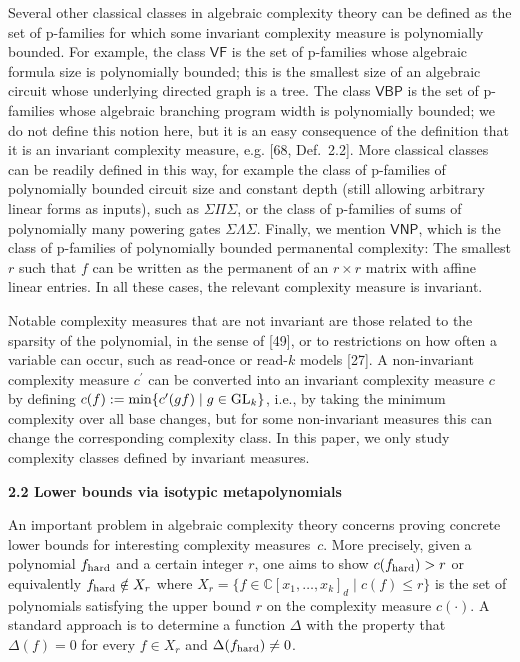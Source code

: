Several other classical classes in algebraic complexity theory can be defined as the set of p-families for which some invariant complexity measure is polynomially bounded.
For example, the class $\mathsf{VF}$ is the set of p-families whose algebraic formula size is polynomially bounded; this is the smallest size of an algebraic circuit whose underlying directed graph is a tree. The class $\mathsf{VBP}$ is the set of p-families whose algebraic branching program width is polynomially bounded; we do not define this notion here, but it is an easy consequence of the definition that it is an invariant complexity measure, e.g. [68, Def. 2.2]. More classical classes can be readily defined in this way, for example the class of p-families of polynomially bounded circuit size and constant depth (still allowing arbitrary linear forms as inputs), such as $\Sigma\Pi\Sigma$, or the class of p-families of sums of polynomially many powering gates $\Sigma\Lambda\Sigma$.
Finally, we mention $\mathsf{VNP}$, which is the class of p-families of polynomially bounded permanental complexity: The smallest $r$ such that $f$ can be written as the permanent of an $r\times r$ matrix with affine linear entries. In all these cases, the relevant complexity measure is invariant.





Notable complexity measures that are not invariant are those related to the sparsity of the polynomial, in the sense of [49], or to restrictions on how often a variable can occur, such as read-once or read-$k$ models [27]. A non-invariant complexity measure $c^{\prime}$ can be converted into an invariant complexity measure $c$ by defining $c(f):=\min\{c^{\prime}(gf)\mid g\in\textnormal{GL}_{k}\}$, i.e., by taking the minimum complexity over all base changes, but for some non-invariant measures this can change the corresponding complexity class. In this paper, we only study complexity classes defined by invariant measures.






\par\medskip\noindent\textbf{2.2 Lower bounds via isotypic metapolynomials}\par




An important problem in algebraic complexity theory concerns proving concrete lower bounds for interesting complexity measures $c$. More precisely, given a polynomial $f_{\textup{hard}}$ and a certain integer $r$, one aims to show $c(f_{{\textup{hard}}})>r$ or equivalently $f_{{\textup{hard}}}\notin X_{r}$ where $X_{r}=\{f\in\mathbb{C}[x_{1},\ldots,x_{k}]_{d}\mid c(f)\leq r\}$ is the set of polynomials satisfying the upper bound $r$ on the complexity measure $c(\cdot)$. A standard approach is to determine a function $\Delta$ with the property that $\Delta(f)=0$ for every $f\in X_{r}$ and $\Delta(f_{\textup{hard}})\neq 0$.





